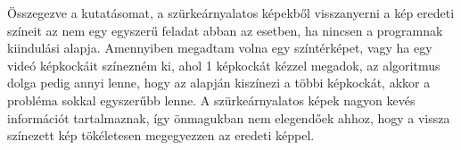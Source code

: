 Összegezve a kutatásomat, a szürkeárnyalatos képekből visszanyerni a kép eredeti színeit az nem egy egyszerű feladat abban az esetben, ha nincsen a programnak kiindulási alapja. Amennyiben megadtam volna egy színtérképet, vagy ha egy videó képkockáit színezném ki, ahol 1 képkockát kézzel megadok, az algoritmus dolga pedig annyi lenne, hogy az alapján kiszínezi a többi képkockát, akkor a probléma sokkal egyszerűbb lenne. A szürkeárnyalatos képek nagyon kevés információt tartalmaznak, így önmagukban nem elegendőek ahhoz, hogy a vissza színezett kép tökéletesen megegyezzen az eredeti képpel.


